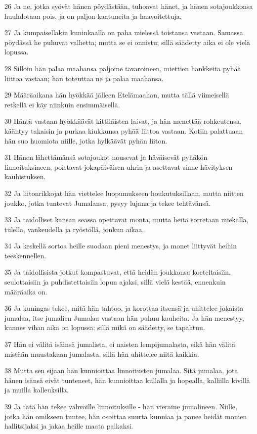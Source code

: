 \par 26 Ja ne, jotka syövät hänen pöydästään, tuhoavat hänet, ja hänen sotajoukkonsa huuhdotaan pois, ja on paljon kaatuneita ja haavoitettuja.
\par 27 Ja kumpaisellakin kuninkaalla on paha mielessä toistansa vastaan. Samassa pöydässä he puhuvat valhetta; mutta se ei onnistu; sillä säädetty aika ei ole vielä lopussa.
\par 28 Silloin hän palaa maahansa paljoine tavaroineen, miettien hankkeita pyhää liittoa vastaan; hän toteuttaa ne ja palaa maahansa.
\par 29 Määräaikana hän hyökkää jälleen Etelämaahan, mutta tällä viimeisellä retkellä ei käy niinkuin ensimmäisellä.
\par 30 Häntä vastaan hyökkäävät kittiläisten laivat, ja hän menettää rohkeutensa, kääntyy takaisin ja purkaa kiukkunsa pyhää liittoa vastaan. Kotiin palattuaan hän suo huomiota niille, jotka hylkäävät pyhän liiton.
\par 31 Hänen lähettämänsä sotajoukot nousevat ja häväisevät pyhäkön linnoituksineen, poistavat jokapäiväisen uhrin ja asettavat sinne hävityksen kauhistuksen.
\par 32 Ja liitonrikkojat hän viettelee luopumukseen houkutuksillaan, mutta niitten joukko, jotka tuntevat Jumalansa, pysyy lujana ja tekee tehtävänsä.
\par 33 Ja taidolliset kansan seassa opettavat monta, mutta heitä sorretaan miekalla, tulella, vankeudella ja ryöstöllä, jonkun aikaa.
\par 34 Ja keskellä sortoa heille suodaan pieni menestys, ja monet liittyvät heihin teeskennellen.
\par 35 Ja taidollisista jotkut kompastuvat, että heidän joukkonsa koeteltaisiin, seulottaisiin ja puhdistettaisiin lopun ajaksi, sillä vielä kestää, ennenkuin määräaika on.
\par 36 Ja kuningas tekee, mitä hän tahtoo, ja korottaa itsensä ja uhittelee jokaista jumalaa, itse jumalien Jumalaa vastaan hän puhuu kauheita. Ja hän menestyy, kunnes vihan aika on lopussa; sillä mikä on säädetty, se tapahtuu.
\par 37 Hän ei välitä isäinsä jumalista, ei naisten lempijumalasta, eikä hän välitä mistään muustakaan jumalasta, sillä hän uhittelee niitä kaikkia.
\par 38 Mutta sen sijaan hän kunnioittaa linnoitusten jumalaa. Sitä jumalaa, jota hänen isänsä eivät tunteneet, hän kunnioittaa kullalla ja hopealla, kalliilla kivillä ja muilla kalleuksilla.
\par 39 Ja tätä hän tekee vahvoille linnoituksille - hän vieraine jumalineen. Niille, jotka hän omikseen tuntee, hän osoittaa suurta kunniaa ja panee heidät monien hallitsijaksi ja jakaa heille maata palkaksi.
